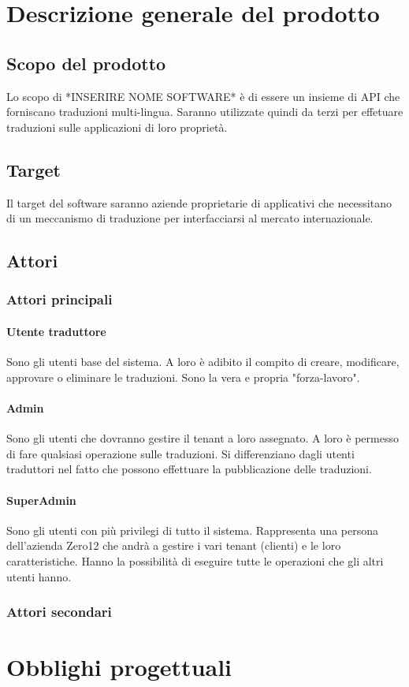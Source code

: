 \section{Descrizione generale del prodotto}
\subsection{Scopo del prodotto}
Lo scopo di *INSERIRE NOME SOFTWARE* è di essere un insieme di API che forniscano traduzioni multi-lingua. Saranno utilizzate quindi da terzi per effetuare traduzioni sulle applicazioni di loro proprietà.
\subsection{Target}
Il target del software saranno aziende proprietarie di applicativi che necessitano di un meccanismo di traduzione per interfacciarsi al mercato internazionale.
\subsection{Attori}
    \subsubsection{Attori principali}
        \paragraph{Utente traduttore}
        Sono gli utenti base del sistema. A loro è adibito il compito di creare, modificare, approvare o eliminare le traduzioni. Sono la vera e propria "forza-lavoro".
        \paragraph{Admin}
        Sono gli utenti che dovranno gestire il tenant a loro assegnato. A loro è permesso di fare qualsiasi operazione sulle traduzioni. Si differenziano dagli utenti traduttori nel fatto che possono effettuare la pubblicazione delle traduzioni.
        \paragraph{SuperAdmin}
        Sono gli utenti con più privilegi di tutto il sistema. Rappresenta una persona dell'azienda Zero12 che andrà a gestire i vari tenant (clienti) e le loro caratteristiche. Hanno la possibilità di eseguire tutte le operazioni che gli altri utenti hanno.
    \subsubsection{Attori secondari}
\section{Obblighi progettuali}